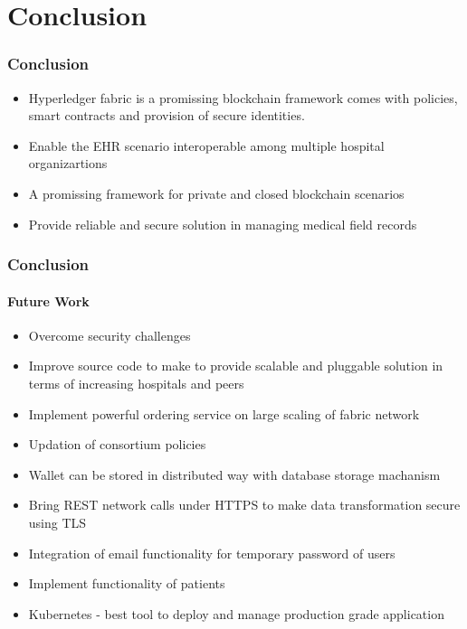 \documentclass[english,hangout]{beamer}
\begin{document}
\section{Conclusion}



\begin{frame}[fragile]
 \frametitle{Conclusion}
    \begin{itemize}
        \item Hyperledger fabric is a promissing blockchain framework comes with policies, smart contracts and provision of secure identities. 
        \item Enable the EHR scenario interoperable among multiple hospital organizartions
        \item A promissing framework for private and closed blockchain scenarios
        \item Provide reliable and secure solution in managing medical field records
    \end{itemize}
\end{frame}



\begin{frame}[fragile]
 \frametitle{Conclusion}
 \framesubtitle{Future Work}
    \begin{itemize}
        \item Overcome security challenges
        \item Improve source code to make to provide scalable and pluggable solution in terms of increasing hospitals and peers
        \item Implement powerful ordering service on large scaling of fabric network 
        \item Updation of consortium policies
        \item Wallet can be stored in distributed way with database storage machanism
        \item Bring REST network calls under HTTPS to make data transformation secure using TLS
        \item Integration of email functionality for temporary password of users
        \item Implement functionality of patients
        \item Kubernetes - best tool to deploy and manage production grade application
    \end{itemize}
\end{frame}
\end{document}
